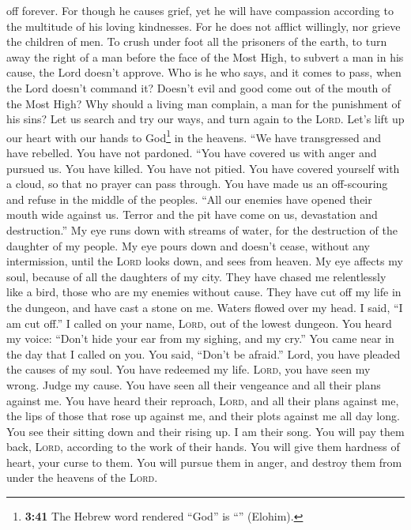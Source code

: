 off forever.  For though he causes grief, yet he will
have compassion according to the multitude of his loving kindnesses.
 For he does not afflict willingly, nor grieve the
children of men.  To crush under foot all the prisoners
of the earth,  to turn away the right of a man before the
face of the Most High,  to subvert a man in his cause,
the Lord doesn't approve.  Who is he who says, and it
comes to pass, when the Lord doesn't command it?  Doesn't
evil and good come out of the mouth of the Most High? 
Why should a living man complain, a man for the punishment of his sins?
 Let us search and try our ways, and turn again to the
\textsc{Lord}.  Let's lift up our heart with our hands to
God\footnote{\textbf{3:41} The Hebrew word rendered ``God'' is
  ``'' (Elohim).} in the heavens.  ``We
have transgressed and have rebelled. You have not pardoned.
 ``You have covered us with anger and pursued us. You
have killed. You have not pitied.  You have covered
yourself with a cloud, so that no prayer can pass through.
 You have made us an off-scouring and refuse in the
middle of the peoples.  ``All our enemies have opened
their mouth wide against us.  Terror and the pit have
come on us, devastation and destruction.''  My eye runs
down with streams of water, for the destruction of the daughter of my
people.  My eye pours down and doesn't cease, without any
intermission,  until the \textsc{Lord} looks down, and
sees from heaven.  My eye affects my soul, because of all
the daughters of my city.  They have chased me
relentlessly like a bird, those who are my enemies without cause.
 They have cut off my life in the dungeon, and have cast
a stone on me.  Waters flowed over my head. I said, ``I
am cut off.''  I called on your name, \textsc{Lord}, out
of the lowest dungeon.  You heard my voice: ``Don't hide
your ear from my sighing, and my cry.''  You came near in
the day that I called on you. You said, ``Don't be afraid.''
 Lord, you have pleaded the causes of my soul. You have
redeemed my life.  \textsc{Lord}, you have seen my wrong.
Judge my cause.  You have seen all their vengeance and
all their plans against me.  You have heard their
reproach, \textsc{Lord}, and all their plans against me, 
the lips of those that rose up against me, and their plots against me
all day long.  You see their sitting down and their
rising up. I am their song.  You will pay them back,
\textsc{Lord}, according to the work of their hands.  You
will give them hardness of heart, your curse to them. 
You will pursue them in anger, and destroy them from under the heavens
of the \textsc{Lord}.

